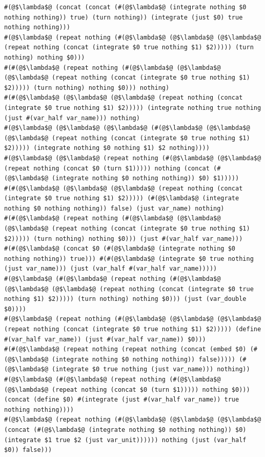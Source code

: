 \documentclass{article}
\begin{document}
\begin{lstlisting}
#(@$\lambda$@ (concat (concat (#(@$\lambda$@ (integrate nothing $0 nothing nothing)) true) (turn nothing)) (integrate (just $0) true nothing nothing)))
#(@$\lambda$@ (repeat nothing (#(@$\lambda$@ (@$\lambda$@ (@$\lambda$@ (repeat nothing (concat (integrate $0 true nothing $1) $2))))) (turn nothing) nothing $0)))
#(#(@$\lambda$@ (repeat nothing (#(@$\lambda$@ (@$\lambda$@ (@$\lambda$@ (repeat nothing (concat (integrate $0 true nothing $1) $2))))) (turn nothing) nothing $0))) nothing)
#(#(@$\lambda$@ (@$\lambda$@ (@$\lambda$@ (repeat nothing (concat (integrate $0 true nothing $1) $2))))) (integrate nothing true nothing (just #(var_half var_name))) nothing)
#(@$\lambda$@ (@$\lambda$@ (@$\lambda$@ (#(@$\lambda$@ (@$\lambda$@ (@$\lambda$@ (repeat nothing (concat (integrate $0 true nothing $1) $2))))) (integrate nothing $0 nothing $1) $2 nothing))))
#(@$\lambda$@ (@$\lambda$@ (repeat nothing (#(@$\lambda$@ (@$\lambda$@ (repeat nothing (concat $0 (turn $1))))) nothing (concat (#(@$\lambda$@ (integrate nothing $0 nothing nothing)) $0) $1)))))
#(#(@$\lambda$@ (@$\lambda$@ (@$\lambda$@ (repeat nothing (concat (integrate $0 true nothing $1) $2))))) (#(@$\lambda$@ (integrate nothing $0 nothing nothing)) false) (just var_name) nothing)
#(#(@$\lambda$@ (repeat nothing (#(@$\lambda$@ (@$\lambda$@ (@$\lambda$@ (repeat nothing (concat (integrate $0 true nothing $1) $2))))) (turn nothing) nothing $0))) (just #(var_half var_name)))
#(#(@$\lambda$@ (concat $0 (#(@$\lambda$@ (integrate nothing $0 nothing nothing)) true))) #(#(@$\lambda$@ (integrate $0 true nothing (just var_name))) (just (var_half #(var_half var_name)))))
#(@$\lambda$@ (#(@$\lambda$@ (repeat nothing (#(@$\lambda$@ (@$\lambda$@ (@$\lambda$@ (repeat nothing (concat (integrate $0 true nothing $1) $2))))) (turn nothing) nothing $0))) (just (var_double $0))))
#(@$\lambda$@ (repeat nothing (#(@$\lambda$@ (@$\lambda$@ (@$\lambda$@ (repeat nothing (concat (integrate $0 true nothing $1) $2))))) (define #(var_half var_name)) (just #(var_half var_name)) $0)))
#(#(@$\lambda$@ (repeat nothing (repeat nothing (concat (embed $0) (#(@$\lambda$@ (integrate nothing $0 nothing nothing)) false))))) (#(@$\lambda$@ (integrate $0 true nothing (just var_name))) nothing))
#(@$\lambda$@ (#(@$\lambda$@ (repeat nothing (#(@$\lambda$@ (@$\lambda$@ (repeat nothing (concat $0 (turn $1))))) nothing $0))) (concat (define $0) #(integrate (just #(var_half var_name)) true nothing nothing))))
#(@$\lambda$@ (repeat nothing (#(@$\lambda$@ (@$\lambda$@ (@$\lambda$@ (concat (#(@$\lambda$@ (integrate nothing $0 nothing nothing)) $0) (integrate $1 true $2 (just var_unit)))))) nothing (just (var_half $0)) false)))

\end{lstlisting}
\end{document}
